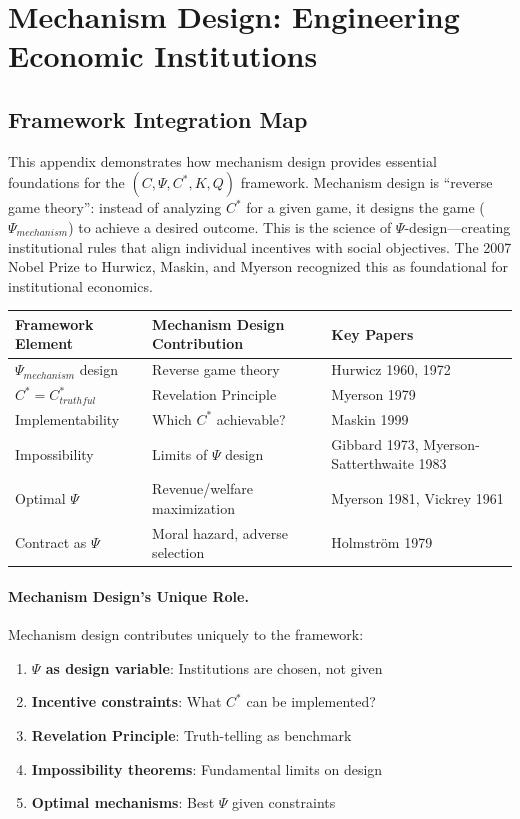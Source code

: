 \section{Mechanism Design: Engineering Economic Institutions}
\label{app:mechanism-design}

\subsection{Framework Integration Map}

This appendix demonstrates how mechanism design provides essential foundations 
for the $(C, \Psi, C^*, K, Q)$ framework. Mechanism design is ``reverse game 
theory'': instead of analyzing $C^*$ for a given game, it designs the game 
($\Psi_{mechanism}$) to achieve a desired outcome. This is the science of 
$\Psi$-design---creating institutional rules that align individual incentives 
with social objectives. The 2007 Nobel Prize to Hurwicz, Maskin, and Myerson 
recognized this as foundational for institutional economics.

\begin{center}
\renewcommand{\arraystretch}{1.4}
\begin{tabular}{|l|l|l|}
\hline
\textbf{Framework Element} & \textbf{Mechanism Design Contribution} & \textbf{Key Papers} \\
\hline
$\Psi_{mechanism}$ design & Reverse game theory & Hurwicz 1960, 1972 \\
$C^* = C^*_{truthful}$ & Revelation Principle & Myerson 1979 \\
Implementability & Which $C^*$ achievable? & Maskin 1999 \\
Impossibility & Limits of $\Psi$ design & Gibbard 1973, Myerson-Satterthwaite 1983 \\
Optimal $\Psi$ & Revenue/welfare maximization & Myerson 1981, Vickrey 1961 \\
Contract as $\Psi$ & Moral hazard, adverse selection & Holmström 1979 \\
\hline
\end{tabular}
\end{center}

\paragraph{Mechanism Design's Unique Role.}
Mechanism design contributes uniquely to the framework:
\begin{enumerate}
    \item \textbf{$\Psi$ as design variable}: Institutions are chosen, not given
    \item \textbf{Incentive constraints}: What $C^*$ can be implemented?
    \item \textbf{Revelation Principle}: Truth-telling as benchmark
    \item \textbf{Impossibility theorems}: Fundamental limits on design
    \item \textbf{Optimal mechanisms}: Best $\Psi$ given constraints
\end{enumerate}

